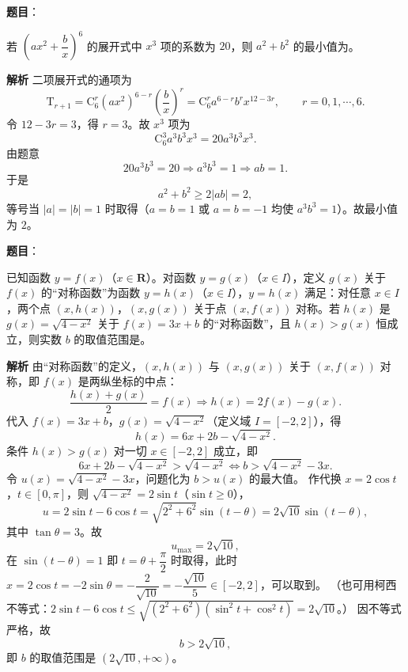 \begin{answer}

\textbf{题目}：

若 $\left(ax^2+\dfrac bx\right)^6$ 的展开式中 $x^3$ 项的系数为 $20$，则 $a^2+b^2$ 的最小值为\gkblank{}。

\textbf{解析}
二项展开式的通项为
\nopagebreak[4]
\[\mathrm T_{r+1}=\mathrm C_6^r(ax^2)^{6-r}\left(\frac bx\right)^r
=\mathrm C_6^ra^{6-r}b^r x^{12-3r},\qquad r=0,1,\cdots,6 .\]
令 $12-3r=3$，得 $r=3$。故 $x^3$ 项为
\nopagebreak[4]
\[\mathrm C_6^3a^3b^3x^3=20a^3b^3x^3 .\]
由题意
\nopagebreak[4]
\[20a^3b^3=20\Longrightarrow a^3b^3=1\Longrightarrow ab=1 .\]
于是
\nopagebreak[4]
\[a^2+b^2\geqslant2|ab|=2,\]
等号当 $|a|=|b|=1$ 时取得（$a=b=1$ 或 $a=b=-1$ 均使 $a^3b^3=1$）。故最小值为 $2$。


\end{answer}
\begin{answer}

\textbf{题目}：

已知函数 $y=f(x)$（$x\in\mathbf R$）。对函数 $y=g(x)$（$x\in I$），定义 $g(x)$ 关于 $f(x)$ 的“对称函数”为函数 $y=h(x)$（$x\in I$），$y=h(x)$ 满足：对任意 $x\in I$，两个点 $(x,h(x))$，$(x,g(x))$ 关于点 $(x,f(x))$ 对称。若 $h(x)$ 是 $g(x)=\sqrt{4-x^2}$ 关于 $f(x)=3x+b$ 的“对称函数”，且 $h(x)>g(x)$ 恒成立，则实数 $b$ 的取值范围是\gkblank{}。

\textbf{解析}
由“对称函数”的定义，$(x,h(x))$ 与 $(x,g(x))$ 关于 $(x,f(x))$ 对称，即 $f(x)$ 是两纵坐标的中点：
\nopagebreak[4]
\[\frac{h(x)+g(x)}2=f(x)\Longrightarrow h(x)=2f(x)-g(x) .\]
代入 $f(x)=3x+b$，$g(x)=\sqrt{4-x^2}$（定义域 $I=[-2,2]$），得
\nopagebreak[4]
\[h(x)=6x+2b-\sqrt{4-x^2} .\]
条件 $h(x)>g(x)$ 对一切 $x\in[-2,2]$ 成立，即
\nopagebreak[4]
\[6x+2b-\sqrt{4-x^2}>\sqrt{4-x^2}
\iff b>\sqrt{4-x^2}-3x .\]
令 $u(x)=\sqrt{4-x^2}-3x$，问题化为 $b>u(x)$ 的最大值。
作代换 $x=2\cos t$，$t\in[0,\pi]$，则 $\sqrt{4-x^2}=2\sin t$（$\sin t\geqslant0$），
\nopagebreak[4]
\[u=2\sin t-6\cos t=\sqrt{2^2+6^2}\sin(t-\theta)=2\sqrt{10}\sin(t-\theta),\]
其中 $\tan\theta=3$。故
\nopagebreak[4]
\[u_{\max}=2\sqrt{10},\]
在 $\sin(t-\theta)=1$ 即 $t=\theta+\dfrac\pi2$ 时取得，此时 $x=2\cos t=-2\sin\theta=-\dfrac{2}{\sqrt{10}}=-\dfrac{\sqrt{10}}5\in[-2,2]$，可以取到。
（也可用柯西不等式：$2\sin t-6\cos t\leqslant\sqrt{(2^2+6^2)(\sin^2t+\cos^2t)}=2\sqrt{10}$。）
因不等式严格，故
\nopagebreak[4]
\[b>2\sqrt{10},\]
即 $b$ 的取值范围是 $(2\sqrt{10},+\infty)$。


\end{answer}
